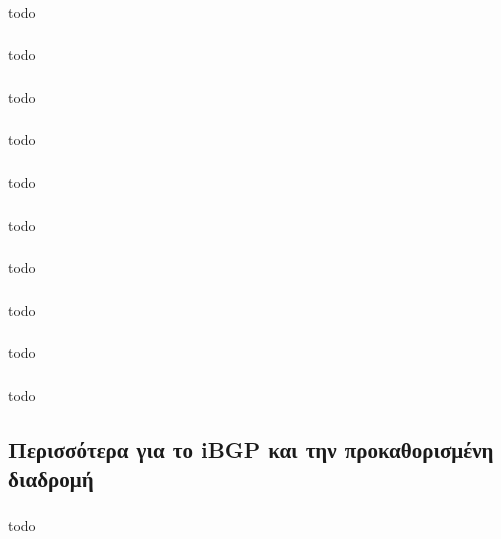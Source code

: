\documentclass[a4paper, 12pt]{article}
\begin{document}
		\subsubsection{}
			todo

		\subsubsection{}
			todo

		\subsubsection{}
			todo

		\subsubsection{}
			todo

		\subsubsection{}
			todo

		\subsubsection{}
			todo

		\subsubsection{}
			todo

		\subsubsection{}
			todo

		\subsubsection{}
			todo

		\subsubsection{}
			todo

	\subsection{Περισσότερα για το iBGP και την προκαθορισμένη διαδρομή}

		\subsubsection{}
			todo
\end{document}

